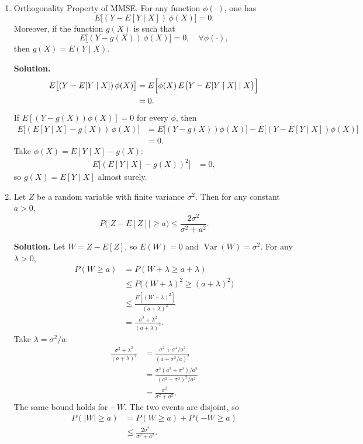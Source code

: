 \documentclass[11pt]{article}
\newcommand{\Var}{\operatorname{Var}}
\begin{document}
\begin{enumerate}[label=\arabic*., leftmargin=1.6em]
\begin{enumerate}
\newpage
\item Orthogonality Property of MMSE. For any function $\phi(\cdot)$, one has
\[
E\bigl[(Y-E[Y\mid X])\,\phi(X)\bigr] = 0.
\]
Moreover, if the function $g(X)$ is such that
\[
E\bigl[(Y-g(X))\,\phi(X)\bigr] = 0, \quad \forall \phi(\cdot),
\]
then $g(X)=E(Y\mid X)$.

\textbf{Solution.}
\begin{align*}
E\bigl[(Y-E[Y\mid X])\,\phi(X)\bigr]
&= E\Bigl[\phi(X)\,E\bigl(Y-E[Y\mid X]\mid X\bigr)\Bigr] \\
&= 0.
\end{align*}
If \(E[(Y-g(X))\phi(X)]=0\) for every \(\phi\), then
\begin{align*}
E\bigl[(E[Y\mid X]-g(X))\,\phi(X)\bigr]
&= E\bigl[(Y-g(X))\phi(X)\bigr]
- E\bigl[(Y-E[Y\mid X])\phi(X)\bigr] \\
&= 0.
\end{align*}
Take \(\phi(X)=E[Y\mid X]-g(X)\):
\begin{align*}
E\bigl[(E[Y\mid X]-g(X))^{2}\bigr]
&= 0,
\end{align*}
so \(g(X)=E[Y\mid X]\) almost surely.

\newpage
\item Let $Z$ be a random variable with finite variance $\sigma^{2}$. Then for any constant $a>0$,
\[
P\bigl(|Z-E[Z]|\ge a\bigr) \le \frac{2\sigma^{2}}{\sigma^{2}+a^{2}}.
\]

\textbf{Solution.}
Let \(W=Z-E[Z]\), so \(E(W)=0\) and \(\Var(W)=\sigma^{2}\). For any \(\lambda>0\),
\begin{align*}
P(W\ge a)
&= P(W+\lambda\ge a+\lambda) \\
&\le P\bigl((W+\lambda)^{2}\ge (a+\lambda)^{2}\bigr) \\
&\le \frac{E[(W+\lambda)^{2}]}{(a+\lambda)^{2}} \\
&= \frac{\sigma^{2}+\lambda^{2}}{(a+\lambda)^{2}}.
\end{align*}
Take \(\lambda=\sigma^{2}/a\):
\begin{align*}
\frac{\sigma^{2}+\lambda^{2}}{(a+\lambda)^{2}}
&= \frac{\sigma^{2}+\sigma^{4}/a^{2}}{(a+\sigma^{2}/a)^{2}} \\
&= \frac{\sigma^{2}(a^{2}+\sigma^{2})/a^{2}}{(a^{2}+\sigma^{2})^{2}/a^{2}} \\
&= \frac{\sigma^{2}}{\sigma^{2}+a^{2}}.
\end{align*}
The same bound holds for \(-W\). The two events are disjoint, so
\begin{align*}
P(|W|\ge a)
&= P(W\ge a)+P(-W\ge a) \\
&\le \frac{2\sigma^{2}}{\sigma^{2}+a^{2}}.
\end{align*}


\end{enumerate}
\end{enumerate}
\end{document}
